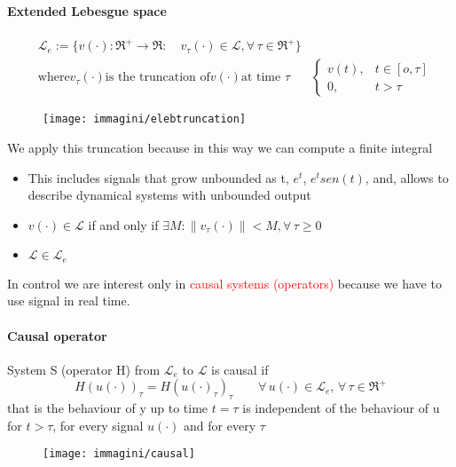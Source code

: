 \paragraph{Extended Lebesgue space}
\[
\begin{aligned}
	&\mathcal{L}_e:=\{v(\cdot):\Re^+\to\Re:\quad v_{\tau}(\cdot) \in \mathcal{L},\forall\,\tau \in\Re^+\}\\
	&\text{where} v_{\tau}(\cdot) \text{is the truncation of} v(\cdot) \text{at time } \tau
	&\begin{cases}
		v(t), & t\in[o,\tau]\\
		0, & t>\tau
	\end{cases}
\end{aligned}
\]
\begin{figure}[H]
	\centering
	\texttt{[image: immagini/elebtruncation]}
	\caption{}
	\label{fig:elebtruncation}
\end{figure}
We apply this truncation because in this way we can compute a finite integral
\begin{remark}
	\begin{itemize}
		\item This includes signals that grow unbounded as t, $e^t$, $e^tsen(t)$, and, allows to describe dynamical systems with unbounded output
		\item $v(\cdot)\in \mathcal{L}$ if and only if $\exists M: \|v_{\tau}(\cdot)\|<M,\forall\,\tau\ge0$
		\item $\mathcal{L}\in\mathcal{L}_e$
	\end{itemize}
\end{remark}
In control we are interest only in \textcolor{red}{causal systems (operators)} because we have to use signal in real time.
\paragraph{Causal operator}
\begin{defn}
		System S (operator H) from $\mathcal{L}_e$ to $\mathcal{L}$ is causal if \[H(u(\cdot))_{\tau}=H(u(\cdot)_{\tau})_{\tau}\qquad \forall\, u(\cdot)\in\mathcal{L}_e,\, \forall\, \tau \in \Re^+\]
that is the behaviour of y up to time $t=\tau$ is independent of the behaviour of u for $t>\tau$, for every signal $u(\cdot)$ and for every $\tau$
\end{defn}
\begin{figure}[H]
	\centering
	\texttt{[image: immagini/causal]}
	\caption{}
	\label{fig:causal}
\end{figure}
